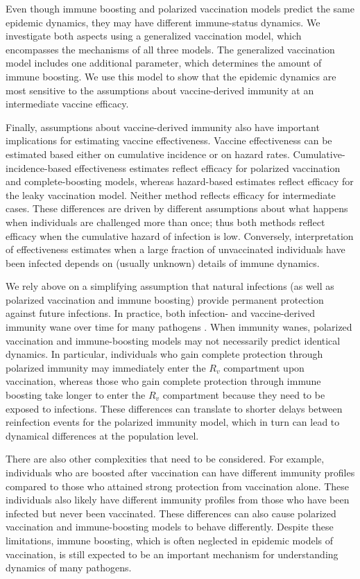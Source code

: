 \documentclass[12pt]{article}
\begin{document}
Even though immune boosting and polarized vaccination models predict the same epidemic dynamics, they may have different immune-status dynamics.
We investigate both aspects using a generalized vaccination model, which encompasses the mechanisms of all three models.
The generalized vaccination model includes one additional parameter, which determines the amount of immune boosting.
We use this model to show that the epidemic dynamics are most sensitive to the assumptions about vaccine-derived immunity at an intermediate vaccine efficacy.

Finally, assumptions about vaccine-derived immunity also have important implications for estimating vaccine effectiveness.
Vaccine effectiveness can be estimated based either on cumulative incidence or on hazard rates.
Cumulative-incidence-based effectiveness estimates reflect efficacy for polarized vaccination and complete-boosting models,
whereas hazard-based estimates reflect efficacy for the leaky vaccination model.
Neither method reflects efficacy for intermediate cases.
These differences are driven by different assumptions about what happens when individuals are challenged more than once; thus both methods reflect efficacy when the cumulative hazard of infection is low. 
Conversely, interpretation of effectiveness estimates when a large fraction of unvaccinated individuals have been infected depends on (usually unknown) details of immune dynamics.

We rely above on a simplifying assumption that natural infections (as well as polarized vaccination and immune boosting) provide permanent protection against future infections.
In practice, both infection- and vaccine-derived immunity wane over time for many pathogens \citep{heffernan2009implications,lewnard2018vaccine,perez2022}.
When immunity wanes, polarized vaccination and immune-boosting models may not necessarily predict identical dynamics.
In particular, individuals who gain complete protection through polarized immunity may immediately enter the $R_v$ compartment upon vaccination, whereas those who gain complete protection through immune boosting take longer to enter the $R_v$ compartment because they need to be exposed to infections.
These differences can translate to shorter delays between reinfection events for the polarized immunity model, which in turn can lead to dynamical differences at the population level.

There are also other complexities that need to be considered.
For example, individuals who are boosted after vaccination can have different immunity profiles compared to those who attained strong protection from vaccination alone.
These individuals also likely have different immunity profiles from those who have been infected but never been vaccinated.
These differences can also cause polarized vaccination and immune-boosting models to behave differently.
Despite these limitations, immune boosting, which is often neglected in epidemic models of vaccination, is still expected to be an important mechanism for understanding dynamics of many pathogens.
\end{document}
